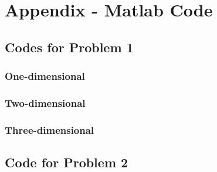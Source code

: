 \documentclass[a4paper,11pt]{article}
\begin{document}
\clearpage
\section*{Appendix - Matlab Code}
\subsection*{Codes for Problem 1}
\subsubsection*{One-dimensional}

\clearpage
\subsubsection*{Two-dimensional}

\clearpage
\subsubsection*{Three-dimensional}

\clearpage
\subsection*{Code for Problem 2}

\end{document}
